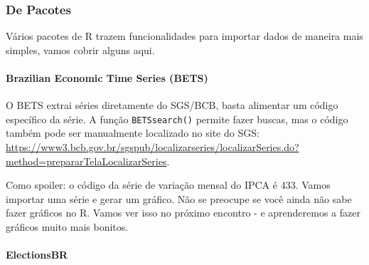 \documentclass[
]{article}
\newenvironment{Shaded}{\begin{snugshade}}{\end{snugshade}}
\newcommand{\DataTypeTok}[1]{\textcolor[rgb]{0.13,0.29,0.53}{#1}}
\newcommand{\DecValTok}[1]{\textcolor[rgb]{0.00,0.00,0.81}{#1}}
\newcommand{\KeywordTok}[1]{\textcolor[rgb]{0.13,0.29,0.53}{\textbf{#1}}}
\newcommand{\NormalTok}[1]{#1}
\newcommand{\StringTok}[1]{\textcolor[rgb]{0.31,0.60,0.02}{#1}}
\begin{document}
\hypertarget{de-pacotes}{%
\subsubsection{De Pacotes}\label{de-pacotes}}

Vários pacotes de R trazem funcionalidades para importar dados de
maneira mais simples, vamos cobrir alguns aqui.

\hypertarget{brazilian-economic-time-series-bets}{%
\paragraph{Brazilian Economic Time Series
(BETS)}\label{brazilian-economic-time-series-bets}}

O BETS extrai séries diretamente do SGS/BCB, basta alimentar um código
específico da série. A função \texttt{BETSsearch()} permite fazer
buscas, mas o código também pode ser manualmente localizado no site do
SGS:
\url{https://www3.bcb.gov.br/sgspub/localizarseries/localizarSeries.do?method=prepararTelaLocalizarSeries}.

Como spoiler: o código da série de variação mensal do IPCA é 433. Vamos
importar uma série e gerar um gráfico. Não se preocupe se você ainda não
sabe fazer gráficos no R. Vamos ver isso no próximo encontro - e
aprenderemos a fazer gráficos muito mais bonitos.

\begin{Shaded}
\end{Shaded}

\hypertarget{electionsbr}{%
\paragraph{ElectionsBR}\label{electionsbr}}
\end{document}
